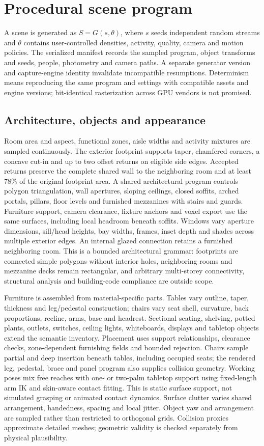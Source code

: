 \documentclass{article}
\begin{document}
\section{Procedural scene program}
A scene is generated as $S=G(s,\theta)$, where $s$ seeds independent random streams and $\theta$ contains user-controlled densities, activity, quality, camera and motion policies. The serialized manifest records the sampled program, object transforms and seeds, people, photometry and camera paths. A separate generator version and capture-engine identity invalidate incompatible resumptions. Determinism means reproducing the same program and settings with compatible assets and engine versions; bit-identical rasterization across GPU vendors is not promised.

\subsection{Architecture, objects and appearance}
Room area and aspect, functional zones, aisle widths and activity mixtures are sampled continuously. The exterior footprint supports taper, chamfered corners, a concave cut-in and up to two offset returns on eligible side edges. Accepted returns preserve the complete shared wall to the neighboring room and at least 78\% of the original footprint area. A shared architectural program controls polygon triangulation, wall apertures, sloping ceilings, closed soffits, arched portals, pillars, floor levels and furnished mezzanines with stairs and guards. Furniture support, camera clearance, fixture anchors and voxel export use the same surfaces, including local headroom beneath soffits. Windows vary aperture dimensions, sill/head heights, bay widths, frames, inset depth and shades across multiple exterior edges. An internal glazed connection retains a furnished neighboring room. This is a bounded architectural grammar: footprints are connected simple polygons without interior holes, neighboring rooms and mezzanine decks remain rectangular, and arbitrary multi-storey connectivity, structural analysis and building-code compliance are outside scope.

Furniture is assembled from material-specific parts. Tables vary outline, taper, thickness and leg/pedestal construction; chairs vary seat shell, curvature, back proportions, recline, arms, base and headrest. Sectional seating, shelving, potted plants, outlets, switches, ceiling lights, whiteboards, displays and tabletop objects extend the semantic inventory. Placement uses support relationships, clearance checks, zone-dependent furnishing fields and bounded rejection. Chairs sample partial and deep insertion beneath tables, including occupied seats; the rendered leg, pedestal, brace and panel program also supplies collision geometry. Working poses mix free reaches with one- or two-palm tabletop support using fixed-length arm IK and skin-aware contact fitting. This is static surface support, not simulated grasping or animated contact dynamics. Surface clutter varies shared arrangement, handedness, spacing and local jitter. Object yaw and arrangement are sampled rather than restricted to orthogonal grids. Collision proxies approximate detailed meshes; geometric validity is checked separately from physical plausibility.
\end{document}
